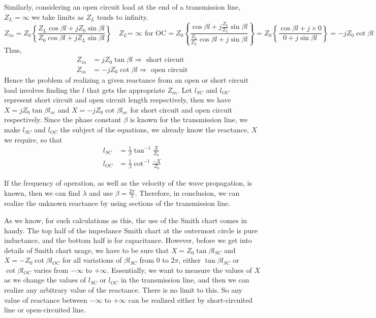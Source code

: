 Similarly, considering an open circuit load at the end of a transmission line, $Z_L = \infty$ we take limits as $Z_L$ tends to infinity.
\begin{dmath}
Z_{in} = Z_0 \left\lbrace \frac{Z_{L}\cos\beta l + jZ_0\sin\beta l}{Z_0\cos\beta l + jZ_{L}\sin\beta l}\right\rbrace \quad Z_{L} \text{= }\infty\text{ for OC}
= Z_0 \left\lbrace \frac{\cos\beta l + j\frac{Z_0}{Z_{L}}\sin\beta l}{\frac{Z_0}{Z_{L}}\cos\beta l + j\sin\beta l}\right\rbrace
= Z_0 \left\lbrace \frac{\cos\beta l + j \times 0}{0 + j\sin\beta l}\right\rbrace = -jZ_0\cot\beta l
\label{eqn:zinopencircuit}
\end{dmath}
Thus,
\begin{align}
Z_{in} &= jZ_0\tan\beta l \Rightarrow \text{ short circuit}\\
Z_{in} &= -jZ_0\cot\beta l \Rightarrow \text{ open circuit}
\end{align}
Hence the problem of realizing a given reactance from an open or short circuit load involves finding the $l$ that gets the appropriate $Z_{in}$. 
Let $l_{SC}$ and $l_{OC}$ represent short circuit and open circuit length respectively, then we have $ X = jZ_0\tan\beta l_{sc} $ and $ X = -jZ_0\cot\beta l_{oc} $ for short circuit and open circuit respectively. Since the phase constant $ \beta $ is known for the transmission line, we make $ l_{SC} $ and $ l_{OC} $ the subject of the equations, we already know the reactance, $X$ we require, so that 
\begin{align}
l_{SC} &= \frac{1}{\beta}\tan^{-1}\frac{X}{Z_0}\\
l_{OC} &= \frac{1}{\beta}\cot^{-1}\frac{-X}{Z_0}
\end{align}

If the frequency of operation, as well as the velocity of the wave propagation, is known, then we can find $\lambda$ and use $\beta = \frac{2\pi}{\lambda} $. Therefore, in conclusion, we can realize the unknown reactance by using sections of the transmission line. 

As we know, for such calculations as this, the use of the Smith chart comes in handy. The top half of the impedance Smith chart at the outermost circle is pure inductance, and the bottom half is for capacitance. However, before we get into details of Smith chart usage, we have to be sure that $X = Z_0\tan\beta l_{SC}$ and $X = -Z_0\cot\beta l_{OC}$ for all variations of $\beta l_{SC}$ from 0 to $ 2\pi $, either $\tan\beta l_{SC}$ or $\cot\beta l_{OC}$ varies from $-\infty$ to $+\infty$. Essentially, we want to measure the values of $X$ as we change the values of $l_{SC}$ or $l_{OC}$ in the transmission line, and then we can realize any arbitrary value of the reactance. There is no limit to this. So any value of reactance between $-\infty$ to $+\infty$ can be realized either by short-circuited line or open-circuited line.

